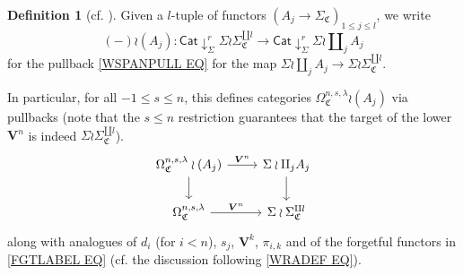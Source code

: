 \documentclass[a4paper,10pt
,draft
]{article}%
\numberwithin{equation}{section}
\numberwithin{figure}{section}
\theoremstyle{definition} %
\newtheorem{definition}[equation]{Definition}%
\newcommand{\1}{\ensuremath{\mathbbm 1}}%
\begin{document}
\begin{definition}[{cf. \cite[Notation 5.24]{BP_geo}}]\label{NA_DEF}
      Given a $l$-tuple of functors
      $\left(A_j \to \Sigma_{\mathfrak C} \right)_{1\leq j \leq l}$,
we write
\begin{equation}\label{WRAJDEF EQ}
(-) \wr (A_j) \colon 
\mathsf{Cat} \downarrow^r_{\Sigma} \Sigma \wr \Sigma_{\mathfrak{C}}^{\amalg l}
\to
\mathsf{Cat} \downarrow^r_{\Sigma} \Sigma \wr \amalg_j A_j
\end{equation}
for the pullback \eqref{WSPANPULL EQ} for the map
$\Sigma \wr \amalg_j A_j \to \Sigma \wr \Sigma_{\mathfrak{C}}^{\amalg l}$.
 
In particular, for all $-1\leq s \leq n$, this defines categories
$\Omega^{n,s,\lambda}_{\mathfrak{C}} \wr (A_j)$ via pullbacks
(note that the $s \leq n$ restriction guarantees that the target of the lower $\boldsymbol{V}^n$ is indeed $\Sigma \wr \Sigma_{\mathfrak{C}}^{\amalg l}$).
\begin{equation}\label{WRAJSAMPLE EQ}
\begin{tikzcd}
	\Omega^{n,s,\lambda}_{\mathfrak{C}} \wr (A_j) \ar{r}{\boldsymbol{V}^n} \ar{d} &
	\Sigma \wr \amalg_j A_j  \ar{d}
\\
	\Omega^{n,s,\lambda}_{\mathfrak{C}} \ar{r}{\boldsymbol{V}^n} &
	\Sigma \wr \Sigma_{\mathfrak{C}}^{\amalg l}
\end{tikzcd}
\end{equation}
along with analogues of $d_i$ (for $i<n$), $s_j$, $\boldsymbol{V}^k$, $\pi_{i,k}$
and of the forgetful functors in \eqref{FGTLABEL EQ}
(cf. the discussion following \eqref{WRADEF EQ}).
\end{definition}
 
\end{document}
